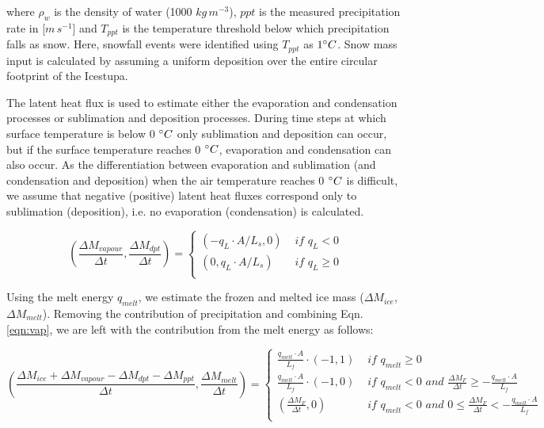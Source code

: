 \documentclass[utf8]{frontiersSCNS} %
\begin{document}
where $\rho_{w}$ is the density of water (1000 $kg\,m^{-3}$), $ppt$ is the measured precipitation rate in
[$m\,s^{-1}$] and $T_{ppt}$ is the temperature threshold below which precipitation falls as snow. Here, snowfall
events were identified using $T_{ppt}$ as $1 \degree C$. Snow mass input is calculated by assuming a uniform
deposition over the entire circular footprint of the Icestupa. 

The latent heat flux is used to estimate either the evaporation and condensation processes or sublimation and deposition
processes. During time steps at which surface temperature is below 0 $\degree C$ only sublimation and deposition can
occur, but if the surface temperature reaches 0 $\degree C$, evaporation and condensation can also occur. As the
differentiation between evaporation and sublimation (and condensation and deposition) when the air temperature reaches 0
$\degree C$ is difficult, we assume that negative (positive) latent heat fluxes correspond only to sublimation
(deposition), i.e. no evaporation (condensation) is calculated.

\begin{equation} (\frac{\Delta M_{vapour}}{\Delta t}, \frac{\Delta M_{dpt}}{\Delta t}) = \left\{ \begin{array}{ll}
(-q_{L} \cdot A /L_s,0) & \textit{ if } q_{L}<0 \\ (0,q_{L} \cdot A /L_s) & \textit{ if } q_{L}\geq0 \\ \end{array}
\right.  \label{eqn:vap} \end{equation}

Using the melt energy $q_{melt}$, we estimate the frozen and melted ice mass ($\Delta M_{ice}$, $\Delta M_{melt}$).
Removing the contribution of precipitation and combining Eqn. \ref{eqn:vap}, we are left with
the contribution from the melt energy as follows:

\begin{equation} (\frac{\Delta M_{ice} + \Delta M_{vapour} - \Delta M_{dpt}-\Delta M_{ppt}}{\Delta
    t}, \frac{\Delta M_{melt}}{\Delta t})
= \left\{ \begin{array}{ll} \frac{q_{melt} \cdot A }{L_f} \cdot (-1, 1 )& \textit{ if } q_{melt} \geq 0 \\
\frac{q_{melt} \cdot A }{L_f} \cdot (-1, 0) & \textit{ if } q_{melt} < 0 \textit{ and } \frac{\Delta M_{F}}{\Delta t}
\geq -\frac{q_{melt} \cdot A }{L_f} \\
(\frac{\Delta M_{F}}{\Delta t}, 0) & \textit{ if } q_{melt} < 0 \textit{ and } 0 \leq
\frac{\Delta M_{F}}{\Delta t} < -\frac{q_{melt} \cdot A }{L_f}\\ \end{array} \right.  \end{equation}
\end{document}
